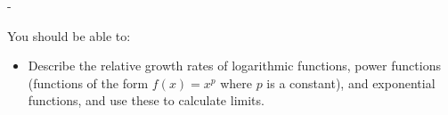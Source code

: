 \documentclass{article}
\makeatletter
\newlength{\tipmargin}
\renewenvironment{framed}{
  \setlength{\tipmargin}{\textwidth-\linewidth}
  \advance\@totalleftmargin-\tipmargin
  \def\FrameCommand{\hspace{\tipmargin}\fbox}%
  \advance\linewidth\tipmargin
  \MakeFramed {\advance\hsize-\width \FrameRestore}%
}
{\endMakeFramed}
\makeatother
\begin{document}

\begin{problemonly}
  \begin{framed}

You should be able to:
    \begin{itemize}[topsep=0pt,partopsep=0pt,parsep=8pt,itemsep=0pt]
    \item Describe the relative growth rates of logarithmic functions, power functions (functions of the form $f(x) = x^p$ where $p$ is a constant), and exponential functions, and use these to calculate limits.    

    \end{itemize}
  \end{framed}
\end{problemonly}
\end{document}
